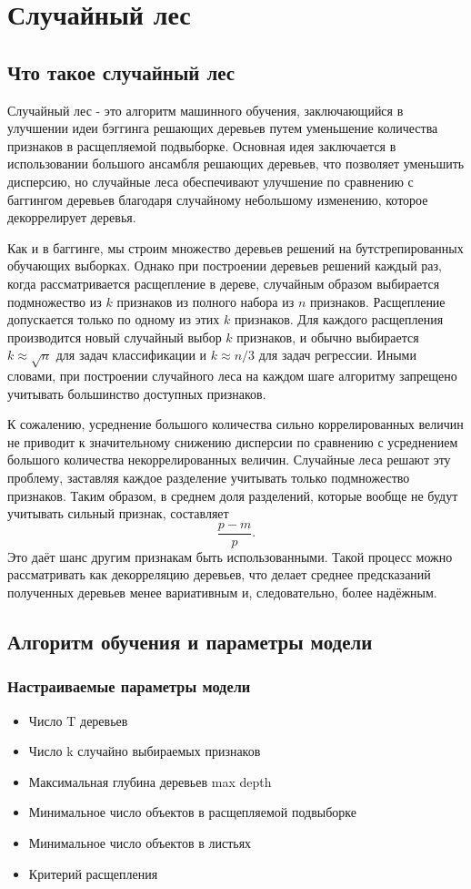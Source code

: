 \section*{Случайный лес}

\subsection*{Что такое случайный лес}
Случайный лес - это алгоритм машинного обучения, заключающийся в улучшении идеи бэггинга решающих деревьев путем уменьшение количества признаков в расщепляемой подвыборке. Основная идея заключается в использовании большого ансамбля решающих деревьев, что позволяет уменьшить дисперсию, но случайные леса обеспечивают улучшение по сравнению с баггингом деревьев благодаря случайному небольшому изменению, которое декоррелирует деревья.  

Как и в баггинге, мы строим множество деревьев решений на бутстрепированных обучающих выборках. Однако при построении деревьев решений каждый раз, когда рассматривается расщепление в дереве, случайным образом выбирается подмножество из \(k\) признаков из полного набора из \(n\) признаков. Расщепление допускается только по одному из этих \(k\) признаков. Для каждого расщепления производится новый случайный выбор \(k\) признаков, и обычно выбирается \(k \approx \sqrt{n}\) для задач классификации и \(k \approx n/3\) для задач регрессии. Иными словами, при построении случайного леса на каждом шаге алгоритму запрещено учитывать большинство доступных признаков.

К сожалению, усреднение большого количества сильно коррелированных величин не приводит к значительному снижению дисперсии по сравнению с усреднением большого количества некоррелированных величин. Случайные леса решают эту проблему, заставляя каждое разделение учитывать только подмножество признаков. Таким образом, в среднем доля разделений, которые вообще не будут учитывать сильный признак, составляет  
\[
\frac{p - m}{p}.
\]  
Это даёт шанс другим признакам быть использованными. Такой процесс можно рассматривать как декорреляцию деревьев, что делает среднее предсказаний полученных деревьев менее вариативным и, следовательно, более надёжным.

\subsection*{Алгоритм обучения и параметры модели}
\subsubsection*{Настраиваемые параметры модели}
\begin{itemize}
    \item Число T деревьев
    \item Число k случайно выбираемых признаков
    \item Максимальная глубина деревьев max depth
    \item Минимальное число объектов в расщепляемой подвыборке
    \item Минимальное число объектов в листьях
    \item Критерий расщепления
\end{itemize}

